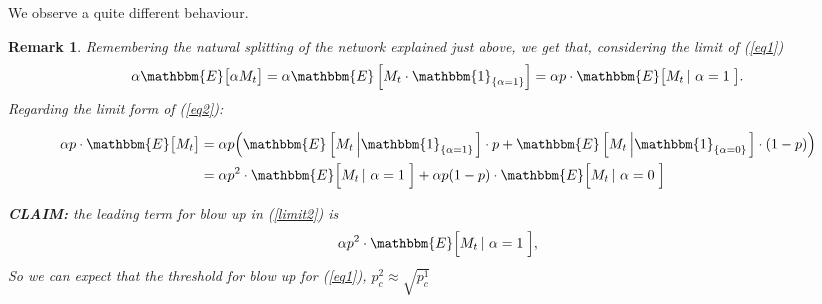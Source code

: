 \documentclass[11pt, a4paper]{article}
\newtheorem{remark}[theorem]{Remark}
\begin{document}
We observe a quite different behaviour.  \\

\begin{remark}
Remembering the natural splitting of the network explained just above, we get that, considering the limit of (\ref{eq1}) \[ \alpha \mathbbm{E} \big[ \alpha M_t \big] = \alpha \mathbbm{E} \left[ M_t \cdot \mathbbm{1}_{ \left\{ \alpha = 1 \right\} } \right] = \alpha p \cdot \mathbbm{E} \big[ M_t \left| \ \alpha = 1 \right. \big]. \] Regarding the limit form of (\ref{eq2}): 

\begin{equation} \label{limit2} 
\begin{aligned} \alpha p \cdot \mathbbm{E} \big[ M_t \big] &= \alpha p \Big( \mathbbm{E} \left[ M_t \left| \mathbbm{1}_{ \left\{ \alpha = 1 \right\} } \right. \right] \cdot p  + \mathbbm{E} \left[ M_t \left| \mathbbm{1}_{ \left\{ \alpha = 0 \right\} } \right. \right] \cdot (1 - p) \Big) \\ & = \alpha p^2 \cdot \mathbbm{E} \Big[ M_t \left| \ \alpha = 1 \right. \Big] + \alpha p (1 - p) \cdot \mathbbm{E} \Big[ M_t \left| \ \alpha = 0 \right. \Big] 
\end{aligned} 
\end{equation}

\textbf{CLAIM:} the leading term for blow up in (\ref{limit2}) is 
\[ \alpha p^2 \cdot \mathbbm{E} \Big[ M_t \left| \ \alpha = 1 \right. \Big], \] 
So we can expect that the threshold for blow up for (\ref{eq1}), $p^2_c\approx \sqrt{p^1_c}$
\end{remark}
\end{document}
